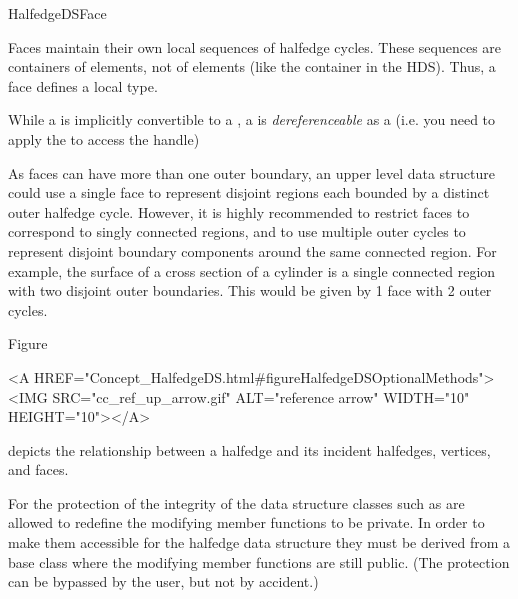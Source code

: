 \begin{ccRefConcept}{HalfedgeDSFace}
\begin{ccAdvanced}
{Faces maintain their own local sequences of halfedge cycles. These sequences are
containers of  elements, not of  elements (like the
container in the HDS). Thus, a face defines a local  type.

While a  is implicitly convertible to a ,
a  is {\em dereferenceable} as a  
(i.e. you need to apply the  to access the handle)
}
\end{ccAdvanced}

\begin{ccAdvanced}
{
As faces can have more than one outer boundary, an upper level data structure could use a single
face to represent disjoint regions each bounded by a distinct outer halfedge cycle. However,
it is highly recommended to restrict faces to correspond to singly connected regions, and
to use multiple outer cycles to represent disjoint boundary components around the same 
connected region. For example, the surface of a cross section of a cylinder is a single
connected region with two disjoint outer boundaries. This would be given by 1 face with
2 outer cycles.
}
\end{ccAdvanced}

Figure~\begin{ccHtmlOnly}
  <A HREF="Concept_HalfedgeDS.html#figureHalfedgeDSOptionalMethods"><IMG 
  SRC="cc_ref_up_arrow.gif" ALT="reference arrow" WIDTH="10" HEIGHT="10"></A>
\end{ccHtmlOnly}
depicts the relationship between a halfedge and its incident
halfedges, vertices, and faces.

For the protection of the integrity of the data structure classes such as
 are allowed to redefine the modifying member 
functions to be private. In order to make them accessible for the 
halfedge data structure they must be derived from a base class 
where the modifying member functions are still public. (The protection
can be bypassed by the user, but not by accident.)


\ccTypes

\ccThreeToTwo


\end{ccRefConcept}
